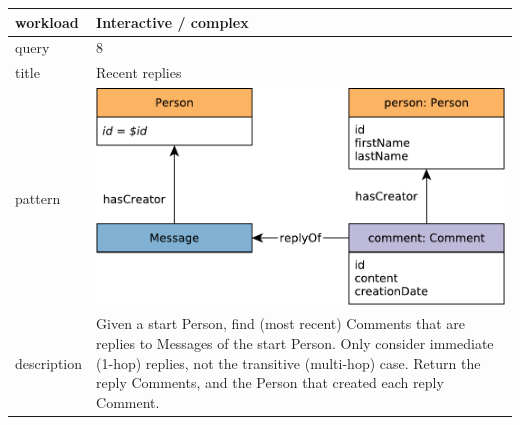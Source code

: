 \renewcommand*{\arraystretch}{1.1}

\noindent\begin{tabularx}{17cm}{|p{1.95cm}|X|}
	\hline
	workload    & Interactive / complex \\ \hline
%
	query       & 8 \\ \hline
%
	title       & Recent replies \\ \hline
%
    pattern     & \hfill\includegraphics[scale=\patternscale,margin=0cm .2cm]{patterns/interactive-complex-read-08}\hfill\vadjust{} \\ \hline
%
	description & Given a start Person, find (most recent) Comments that are replies to
Messages of the start Person. Only consider immediate (1-hop) replies,
not the transitive (multi-hop) case. Return the reply Comments, and the
Person that created each reply Comment.
 \\ \hline
	

\end{tabularx}
